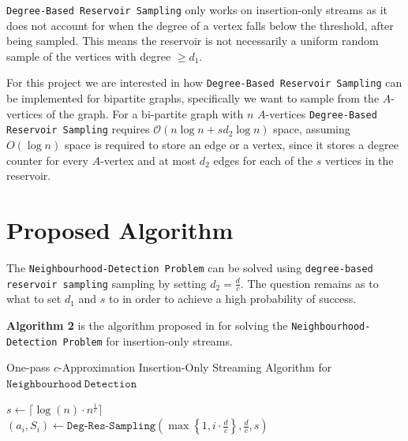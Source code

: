 \documentclass[11pt,twoside,a4paper]{report}
\begin{document}
\par \texttt{Degree-Based Reservoir Sampling} only works on insertion-only streams as it does not account for when the degree of a vertex falls below the threshold, after being sampled. This means the reservoir is not necessarily a uniform random sample of the vertices with degree $\geq d_1$. %

\par For this project we are interested in how \texttt{Degree-Based Reservoir Sampling} can be implemented for bipartite graphs, specifically we want to sample from the $A$-vertices of the graph. For a bi-partite graph with $n$ $A$-vertices \texttt{Degree-Based Reservoir Sampling} requires $\mathcal{O}(n\log n+sd_2\log n)$ space, assuming $O(\log n)$ space is required to store an edge or a vertex, since it stores a degree counter for every $A$-vertex and at most $d_2$ edges for each of the $s$ vertices in the reservoir.

\section{Proposed Algorithm}


The \texttt{Neighbourhood-Detection Problem} can be solved using \texttt{degree-based reservoir sampling} sampling by setting $d_2=\frac{d}c$. The question remains as to what to set $d_1$ and $s$ to in order to achieve a high probability of success. %

\par \textbf{Algorithm 2} is the algorithm proposed in \cite{orig} for solving the \texttt{Neighbourhood-Detection Problem} for insertion-only streams.

\begin{algorithm}
	\caption{One-pass $c$-Approximation Insertion-Only Streaming Algorithm for $\mathtt{Neighbourhood\ Detection}$}
	$s\leftarrow\lceil\log(n)\cdot n^{\frac1c}\rceil$\\
	 {
		$(a_i,S_i)\leftarrow\mathtt{Deg}\mbox{-}\mathtt{Res}\mbox{-}\mathtt{Sampling}\left(\max\left\{1,i\cdot\frac{d}{c}\right\},\frac{d}c,s\right)$
	}
\end{algorithm}
\end{document}
